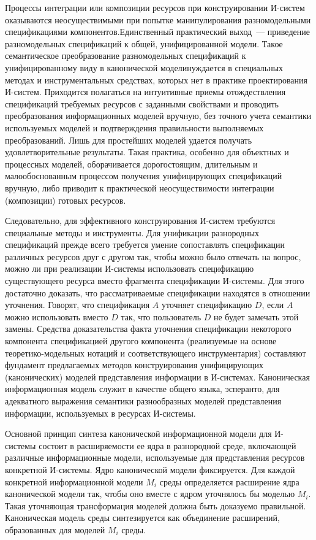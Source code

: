 \begin{multicols}{2}
Процессы интеграции или
композиции ресурсов при конструировании И-систем оказываются неосуществимыми
при попытке манипулирования разномодельными спецификациями
компонентов.\linebreak Единственный практический выход~--- приведение 
разномодельных спецификаций к общей, унифицированной модели. Такое
семантическое преобразование разномодельных спецификаций к
унифицированному виду в канонической модели\linebreak нуждается в специальных
методах и инструментальных средствах, которых нет в практике
проектирования И-систем. Приходится полагаться на
интуитивные приемы отождествления спецификаций требуемых ресурсов с
заданными свойствами и проводить преобразования информационных моделей вручную, без точного
учета семантики используемых моделей и подтверждения правильности
выполняемых преобразований. Лишь для простейших моделей удается
получать удовлетворительные результаты. Такая практика, особенно для
объектных и процессных моделей, оборачивается дорогостоящим,
длительным и малообоснованным процессом получения унифицирующих
спецификаций вручную, либо приводит к практической неосуществимости
интеграции (композиции) готовых ресурсов.

Следовательно, для эффективного конструирования И-систем требуются
специальные методы и инструменты. Для унификации разнородных
спецификаций прежде всего требуется умение сопоставлять спецификации
различных ресурсов друг с другом так, чтобы можно было отвечать на
вопрос, можно ли при реализации И-системы использовать спецификацию
существующего ресурса вместо фрагмента спецификации И-системы. Для
этого достаточно доказать, что рассматриваемые спецификации находятся
в отношении уточнения. Говорят, что спецификация $A$ уточняет
спецификацию $D$, если $A$ можно использовать вместо $D$ так, что
пользователь $D$ не будет замечать этой замены. Средства доказательства факта
уточнения спецификации некоторого компонента спецификацией другого
компонента (реализуемые на основе теоретико-модельных нотаций и
соответствующего инструментария) составляют фундамент предлагаемых
методов конструирования унифицирующих (канонических) моделей
представления информации в И-системах. Каноническая информационная
модель служит в качестве общего языка, эсперанто, для адекватного
выражения семантики разнообразных моделей представления информации,
используемых в ресурсах И-системы.

Основной принцип синтеза канонической информационной модели для
И-системы состоит в расширяемости ее ядра в разнородной среде,
включающей различные информационные модели, используемые для
представления ресурсов конкретной И-системы. Ядро канонической модели
фиксируется. Для каждой конкретной информационной модели $M_i$ среды
определяется расширение ядра канонической модели так, чтобы оно
вместе с ядром уточнялось бы моделью $M_i$. Такая уточняющая
трансформация моделей должна быть доказуемо правильной. Каноническая
модель среды синтезируется как объединение расширений, образованных
для моделей $M_i$ среды.


\end{multicols}
